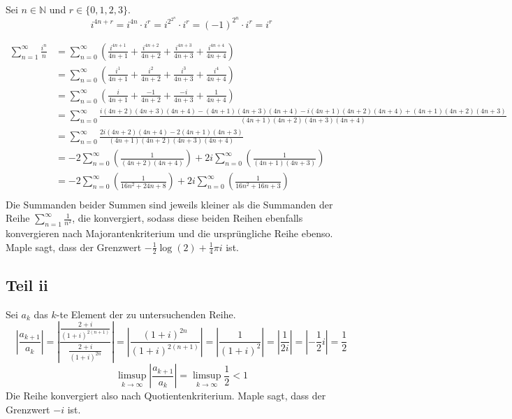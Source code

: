 \documentclass[10pt,a4paper]{article}
\begin{document}
Sei $n \in \mathbb{N}$ und $r \in \{ 0, 1, 2, 3 \}$.
\begin{equation}
  i^{4n + r} = i^{4n} \cdot i^{r} = i^{2^{2^{n}}} \cdot i^{r} = (-1)^{2^{n}} \cdot i^{r} = i^{r}
\end{equation}

\begin{align*}
  \sum_{n = 1}^{\infty} \frac{i^{n}}{n} & = \sum_{n = 0}^{\infty} \left( \frac{i^{4n + 1}}{4n + 1} + \frac{i^{4n + 2}}{4n + 2} + \frac{i^{4n + 3}}{4n + 3} + \frac{i^{4n + 4}}{4n + 4} \right)\\
                                        & = \sum_{n = 0}^{\infty} \left( \frac{i^{1}}{4n + 1} + \frac{i^{2}}{4n + 2} + \frac{i^{3}}{4n + 3} + \frac{i^{4}}{4n + 4} \right)\\
                                        & = \sum_{n = 0}^{\infty} \left( \frac{i}{4n + 1} + \frac{-1}{4n + 2} + \frac{-i}{4n + 3} + \frac{1}{4n + 4} \right)\\
                                        & = \sum_{n = 0}^{\infty} \frac{i(4n + 2)(4n + 3)(4n + 4) - (4n + 1)(4n + 3)(4n + 4) - i(4n + 1)(4n + 2)(4n + 4) + (4n + 1)(4n + 2)(4n + 3)}{(4n + 1)(4n + 2)(4n + 3)(4n + 4)}\\
                                        & = \sum_{n = 0}^{\infty} \frac{2i(4n + 2)(4n + 4) - 2(4n + 1)(4n + 3)}{(4n + 1)(4n + 2)(4n + 3)(4n + 4)}\\
                                        & = -2 \sum_{n = 0}^{\infty} \left( \frac{1}{(4n + 2)(4n + 4)} \right) + 2i \sum_{n = 0}^{\infty} \left( \frac{1}{(4n + 1)(4n + 3)} \right)\\
                                        & = -2 \sum_{n = 0}^{\infty} \left( \frac{1}{16n^{2} + 24n + 8} \right) + 2i \sum_{n = 0}^{\infty} \left( \frac{1}{16n^{2} + 16n + 3} \right)\\
\end{align*}
Die Summanden beider Summen sind jeweils kleiner als die Summanden der Reihe
$\sum_{n = 1}^{\infty} \frac{1}{n^{2}}$, die konvergiert, sodass diese beiden
Reihen ebenfalls konvergieren nach Majorantenkriterium und die ursprüngliche
Reihe ebenso. Maple sagt, dass der Grenzwert $-\frac{1}{2}\log(2) + \frac{1}{4}\pi i$ ist.

\subsection{Teil ii}

Sei $a_{k}$ das $k$-te Element der zu untersuchenden Reihe.
\begin{equation*}
  \left| \frac{a_{k + 1}}{a_{k}} \right| = \left| \frac{\frac{2 + i}{(1 + i)^{2(n + 1)}}}{\frac{2 + i}{(1 + i)^{2n}}} \right| = \left| \frac{(1 + i)^{2n}}{(1 + i)^{2(n + 1)}} \right| = \left| \frac{1}{(1 + i)^{2}} \right| = \left| \frac{1}{2i} \right| = \left| -\frac{1}{2}i \right| = \frac{1}{2}
\end{equation*}
\begin{equation*}
  \limsup_{k \to \infty} \left| \frac{a_{k + 1}}{a_{k}} \right| = \limsup_{k \to \infty} \frac{1}{2} < 1
\end{equation*}
Die Reihe konvergiert also nach Quotientenkriterium. Maple sagt, dass der
Grenzwert $-i$ ist.
\end{document}
